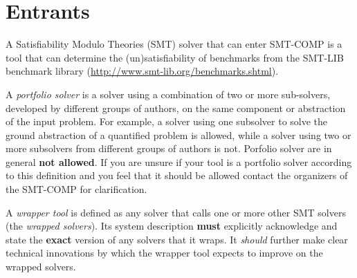 \documentclass[12pt]{article}
\newcommand{\rem}[1]{\textcolor{red}{[#1]}}
\newcommand{\ah}[1]{\rem{#1 -- antti}}
\newcommand{\rationale}[1]{\hskip .5em{\textit{Rationale:} #1}\xspace}
\begin{document}


\section{Entrants}
\label{sec:entrants}

%
A Satisfiability Modulo Theories (SMT) solver that can enter SMT-COMP is a tool that can determine the
(un)satisfia\-bility of benchmarks from the SMT-LIB benchmark library
(\url{http://www.smt-lib.org/benchmarks.shtml}).

%
A \emph{portfolio solver} is a solver using a combination of two or
more sub-solvers, developed by different groups of authors, on the
same component or abstraction of the input problem.  For example, a
solver using one subsolver to solve the ground abstraction of a
quantified problem is allowed, while a solver using two or more
subsolvers from different groups of authors is not.
Porfolio solver are in general \textbf{not allowed}.
If you are unsure if your tool is a portfolio solver according to this
definition and you feel that it should be allowed contact the
organizers of the SMT-COMP for clarification.

%
A \emph{wrapper tool} is defined as any solver that calls one or more other SMT
solvers (the \emph{wrapped solvers}). Its system description \textbf{must}
explicitly acknowledge and state the \textbf{exact} version of any solvers that
it wraps.  It \emph{should} further make clear technical innovations by which
the wrapper tool expects to improve on the wrapped solvers.
\end{document}
